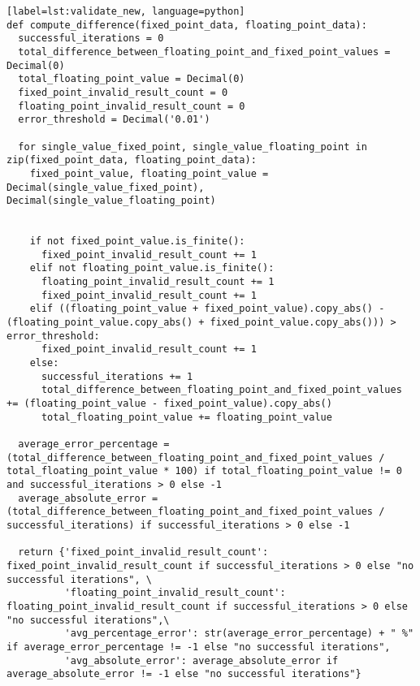 \begin{verbatim}[label=lst:validate_new, language=python]
def compute_difference(fixed_point_data, floating_point_data):
  successful_iterations = 0
  total_difference_between_floating_point_and_fixed_point_values = Decimal(0)
  total_floating_point_value = Decimal(0)
  fixed_point_invalid_result_count = 0
  floating_point_invalid_result_count = 0
  error_threshold = Decimal('0.01')

  for single_value_fixed_point, single_value_floating_point in zip(fixed_point_data, floating_point_data):
    fixed_point_value, floating_point_value = Decimal(single_value_fixed_point), Decimal(single_value_floating_point)


    if not fixed_point_value.is_finite():
      fixed_point_invalid_result_count += 1
    elif not floating_point_value.is_finite():
      floating_point_invalid_result_count += 1
      fixed_point_invalid_result_count += 1
    elif ((floating_point_value + fixed_point_value).copy_abs() - (floating_point_value.copy_abs() + fixed_point_value.copy_abs())) > error_threshold:
      fixed_point_invalid_result_count += 1
    else:
      successful_iterations += 1
      total_difference_between_floating_point_and_fixed_point_values += (floating_point_value - fixed_point_value).copy_abs()
      total_floating_point_value += floating_point_value
      
  average_error_percentage = (total_difference_between_floating_point_and_fixed_point_values / total_floating_point_value * 100) if total_floating_point_value != 0 and successful_iterations > 0 else -1
  average_absolute_error = (total_difference_between_floating_point_and_fixed_point_values / successful_iterations) if successful_iterations > 0 else -1
      
  return {'fixed_point_invalid_result_count': fixed_point_invalid_result_count if successful_iterations > 0 else "no successful iterations", \
          'floating_point_invalid_result_count': floating_point_invalid_result_count if successful_iterations > 0 else "no successful iterations",\
          'avg_percentage_error': str(average_error_percentage) + " %" if average_error_percentage != -1 else "no successful iterations",
          'avg_absolute_error': average_absolute_error if average_absolute_error != -1 else "no successful iterations"}
 
\end{verbatim}

